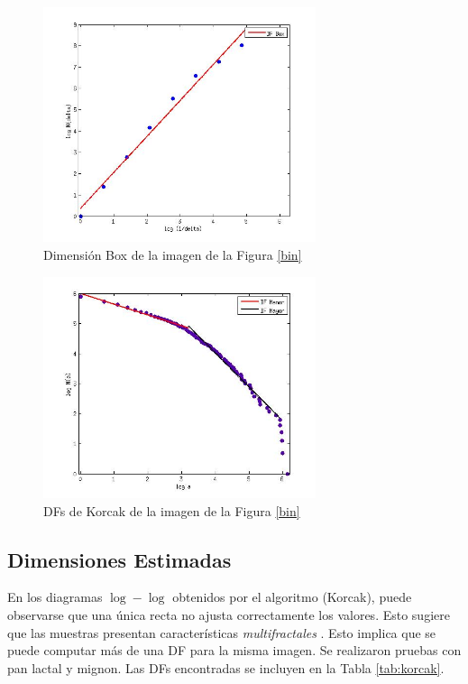 \begin{figure}
\centering
\includegraphics[width=8cm]{figures/fitbox}
\caption{Dimensi\'on Box de la imagen de la Figura \ref{bin}}
\label{fitbox}
\end{figure}


\begin{figure}
\centering
\includegraphics[width=8cm]{figures/lactal1PlotKorcak}
\caption{DFs de Korcak de la imagen de la Figura \ref{bin}}
\label{fit}
\end{figure}

\subsection{Dimensiones Estimadas}

En los diagramas $\log-\log $ obtenidos por el algoritmo (Korcak), puede observarse que una \'unica recta no ajusta correctamente los valores. Esto sugiere que las muestras presentan caracter\'isticas {\em multifractales} \cite{Mandelbrot1989}.
Esto implica que se puede computar m\'as de una DF para la misma imagen. Se realizaron pruebas con pan lactal y mignon. Las DFs encontradas se incluyen en la Tabla \ref{tab:korcak}.

